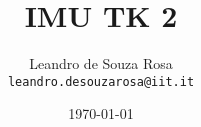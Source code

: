 \documentclass[10pt,a4paper]{article}
\begin{document}
\title{IMU TK 2}
\author{Leandro de Souza Rosa \\ \texttt{leandro.desouzarosa@iit.it}}
\date{\today} %
\maketitle %


\setcounter{tocdepth}{2}
\tableofcontents
\clearpage







\clearpage


\clearpage


\end{document}
